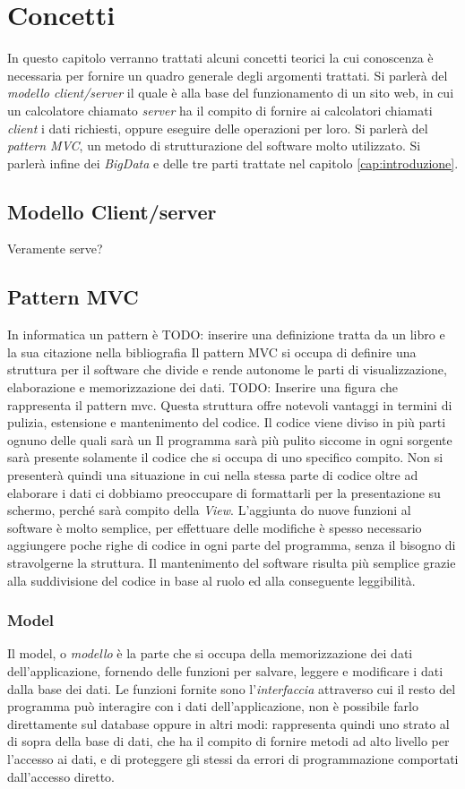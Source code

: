 \chapter{Concetti}%
In questo capitolo verranno trattati alcuni concetti teorici la cui conoscenza è necessaria per fornire un quadro generale degli argomenti trattati. Si parlerà del \emph{modello client/server} il quale è alla base del funzionamento di un sito web, in cui un calcolatore chiamato \emph{server} ha il compito di fornire ai calcolatori chiamati \emph{client} i dati richiesti, oppure eseguire delle operazioni per loro. Si parlerà del \emph{pattern MVC}, un metodo di strutturazione del software molto utilizzato. Si parlerà infine dei \emph{BigData} e delle tre parti trattate nel capitolo \ref{cap:introduzione}.
\section{Modello Client/server}%
Veramente serve?

\section{Pattern MVC}
In informatica un pattern è TODO: inserire una definizione tratta da un libro e la sua citazione nella bibliografia
Il pattern MVC si occupa di definire una struttura per il software che divide e rende autonome le parti di visualizzazione, elaborazione e memorizzazione dei dati.
TODO: Inserire una figura che rappresenta il pattern mvc.
Questa struttura offre notevoli vantaggi in termini di pulizia, estensione e mantenimento del codice. Il codice viene diviso in più parti ognuno delle quali sarà un Il programma sarà più pulito siccome in ogni sorgente sarà presente solamente il codice che si occupa di uno specifico compito. Non si presenterà quindi una situazione in cui nella stessa parte di codice oltre ad elaborare i dati ci dobbiamo preoccupare di formattarli per la presentazione su schermo, perché sarà compito della \emph{View}. L'aggiunta do nuove funzioni al software è molto semplice, per effettuare delle modifiche è spesso necessario aggiungere poche righe di codice in ogni parte del programma, senza il bisogno di stravolgerne la struttura. Il mantenimento del software risulta più semplice grazie alla suddivisione del codice in base al ruolo ed alla conseguente leggibilità.
\subsection{Model}
Il model, o \emph{modello} è la parte che si occupa della memorizzazione dei dati dell'applicazione, fornendo delle funzioni per salvare, leggere e modificare i dati dalla base dei dati. Le funzioni fornite sono l'\emph{interfaccia} attraverso cui il resto del programma può interagire con i dati dell'applicazione, non è possibile farlo direttamente sul database oppure in altri modi: rappresenta quindi uno strato al di sopra della base di dati, che ha il compito di fornire metodi ad alto livello per l'accesso ai dati, e di proteggere gli stessi da errori di programmazione comportati dall'accesso diretto.
